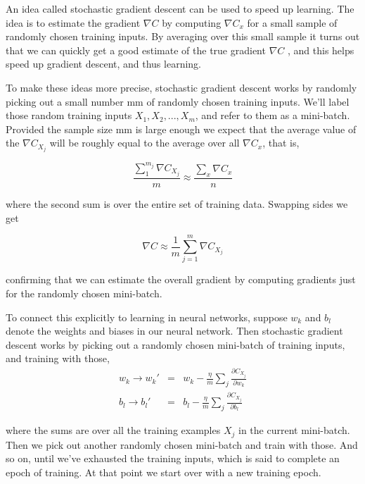\documentclass[a4paper,12pt]{report}%
\begin{document}
An idea called stochastic gradient descent can be used to speed up learning. The idea is to estimate the gradient $\nabla C$ by computing $\nabla C_{x}$ for a small sample of randomly chosen training inputs. By averaging over this small sample it turns out that we can quickly get a good estimate of the true gradient  $\nabla C$ , and this helps speed up gradient descent, and thus learning.

To make these ideas more precise, stochastic gradient descent works by randomly picking out a small number mm of randomly chosen training inputs. We'll label those random training inputs $X_{1}, X_{2},... , X_{m}$, and refer to them as a mini-batch. Provided the sample size mm is large enough we expect that the average value of the  $\nabla C_{X_{j}}$  will be roughly equal to the average over all $\nabla C_{x}$, that is,

\begin{equation}
\frac{\sum_{1}^{m_{j}} \nabla C_{X_{j}}}{m} \approx \frac{\sum_{x} \nabla C_{x}}{n}
\end{equation}

where the second sum is over the entire set of training data. Swapping sides we get

\begin{equation}
 \nabla C \approx \frac{1}{m}\sum_{j=1}^{m} \nabla C_{X_{j}}
\end{equation}

confirming that we can estimate the overall gradient by computing gradients just for the randomly chosen mini-batch.

To connect this explicitly to learning in neural networks, suppose $w_{k}$ and $b_{l}$ denote the weights and biases in our neural network. Then stochastic gradient descent works by picking out a randomly chosen mini-batch of training inputs, and training with those,
\begin{eqnarray}
  w_{k} \rightarrow  w_{k}' &=& w_{k} - \frac{\eta}{m} \sum_{j}\frac{\partial C_{X_{j}}}{\partial w_{k}} \\
  b_{l} \rightarrow  b_{l}' &=& b_{l} - \frac{\eta}{m} \sum_{j}\frac{\partial C_{X_{j}}}{\partial b_{l}}
\end{eqnarray}

where the sums are over all the training examples $X_{j}$ in the current mini-batch. Then we pick out another randomly chosen mini-batch and train with those. And so on, until we've exhausted the training inputs, which is said to complete an epoch of training. At that point we start over with a new training epoch.
\end{document}
